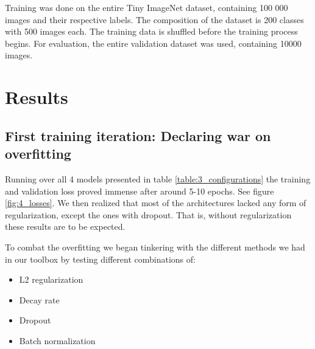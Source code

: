 \documentclass{kthreport}
\begin{document}

\FloatBarrier


Training was done on the entire Tiny ImageNet dataset, containing 100 000 images and their respective labels. The composition of the dataset is 200 classes with 500 images each. The training data is shuffled before the training process begins. For evaluation, the entire validation dataset was used, containing 10000 images.

\section{Results}
\label{sec:Results}

\subsection{First training iteration: Declaring war on overfitting}

Running over all 4 models presented in table \ref{table:3_configurations} the training and validation loss proved immense after around 5-10 epochs. See figure \ref{fig:4_losses}. We then realized that most of the architectures lacked any form of regularization, except the ones with dropout. That is, without regularization these results are to be expected.



To combat the overfitting we began tinkering with the different methods we had in our toolbox by testing different combinations of:

\begin{itemize}

  \item L2 regularization
  \item Decay rate
  \item Dropout
  \item Batch normalization

\end{itemize}
\end{document}
